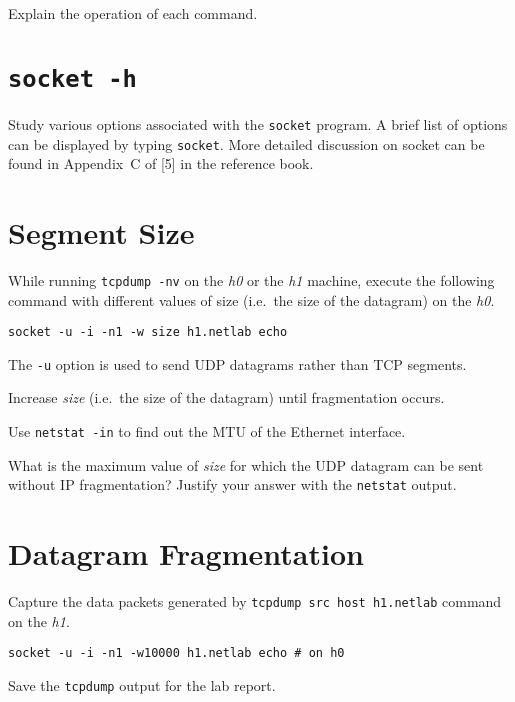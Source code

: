\documentclass{../UTNetLab}
\begin{document}
    \begin{report}
        \item Explain the operation of each command.
    \end{report}

\section{\texttt{socket -h}}
    Study various options associated with the \lstinline{socket} program.
    A brief list of options can be displayed by typing \lstinline{socket}.
    More detailed discussion on socket can be found in Appendix~C of [5] in the reference book.

\section{Segment Size}
    While running \lstinline{tcpdump -nv} on the \textit{h0} or the \textit{h1} machine, execute the following command with different values of size (i.e.\  the size of the datagram) on the \textit{h0}.

    \begin{lstlisting}[emph={size, h1,netlab},morekeywords={[3]echo}]
socket -u -i -n1 -w size h1.netlab echo
    \end{lstlisting}
    
    The \lstinline{-u} option is used to send UDP datagrams rather than TCP segments.

    Increase \textit{size} (i.e.\  the size of the datagram) until fragmentation occurs.

    Use \lstinline{netstat -in} to find out the MTU of the Ethernet interface.

    \begin{report}
        \item What is the maximum value of \textit{size} for which the UDP datagram can be sent without IP fragmentation?
            Justify your answer with the \lstinline{netstat} output.
    \end{report}

\section{Datagram Fragmentation}
    Capture the data packets generated by \lstinline[emph={h1.netlab},morekeywords={[3]src,host}]{tcpdump src host h1.netlab} command on the \textit{h1}.

    \begin{lstlisting}[emph={h1,netlab},morekeywords={[3]echo}]
socket -u -i -n1 -w10000 h1.netlab echo # on h0
    \end{lstlisting}
    Save the \lstinline{tcpdump} output for the lab report.
    
\end{document}
